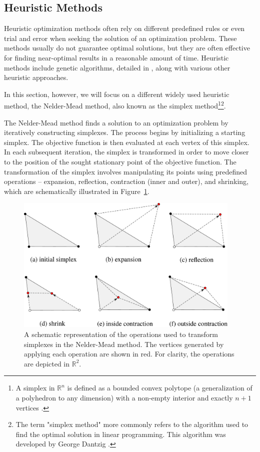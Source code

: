 \subsection{Heuristic Methods}\label{heuristic}
Heuristic optimization methods often rely on different predefined rules or even trial and error when seeking the solution of an optimization problem. These methods usually do not guarantee optimal solutions, but they are often effective for finding near-optimal results in a reasonable amount of time. Heuristic methods include genetic algorithms, detailed in \cite{BBO-textbook}, along with various other heuristic approaches.

In this section, however, we will focus on a different widely used heuristic method, the Nelder-Mead method, also known as the simplex method\footnote{A simplex in $ \mathbb{R}^n $ is defined as a bounded convex polytope (a generalization of a polyhedron to any dimension) with a non-empty interior and exactly $ n+1 $ vertices \cite{BBO-textbook}.}\footnote{The term "simplex method" more commonly refers to the algorithm used to find the optimal solution in linear programming. This algorithm was developed by George Dantzig \cite{Dantzig1990}.}\cite{Nelder1965}.

The Nelder-Mead method finds a solution to an optimization problem by iteratively constructing simplexes. The process begins by initializing a starting simplex. The objective function is then evaluated at each vertex of this simplex. In each subsequent iteration, the simplex is transformed in order to move closer to the position of the sought stationary point of the objective function. The transformation of the simplex involves manipulating its points using predefined operations -- expansion, reflection, contraction (inner and outer), and shrinking, which are schematically illustrated in Figure~\ref{fig:NM operations}. 

\begin{figure}[H]
	\centering
	\includegraphics[width=0.96\textwidth]{figures/neldermead.pdf}
	\vspace{2mm}
	\caption{A schematic representation of the operations used to transform simplexes in the Nelder-Mead method. The vertices generated by applying each operation are shown in red. For clarity, the operations are depicted in $ \mathbb{R}^2 $.}
	\label{fig:NM operations}
\end{figure}

